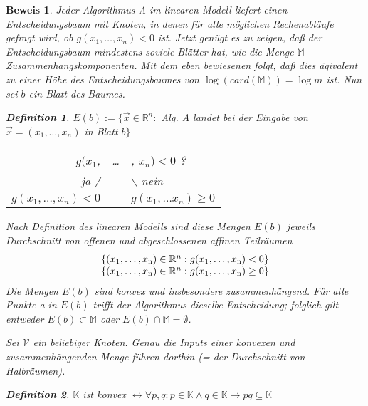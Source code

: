 \documentclass[ngerman,draft,parskip=half*,twoside]{scrreprt}
\theoremstyle{break}
\newtheorem{beweis}{Beweis}
\newtheorem{definition}{Definition}
\begin{document}
\begin{beweis}
Jeder Algorithmus A im linearen Modell liefert einen Entscheidungsbaum mit Knoten, in denen für alle möglichen Rechenabläufe
gefragt wird, ob \( g( x_1, \dots , x_n) < 0 \)  ist. Jetzt genügt es zu zeigen, daß der Entscheidungsbaum mindestens soviele
Blätter hat, wie die Menge \( \mathbb{M}  \) Zusammenhangskomponenten. Mit dem eben bewiesenen folgt, daß dies äqivalent zu einer Höhe
des Entscheidungsbaumes von \(\log (card(\mathbb{M}))=\log m\) ist. Nun sei $b$ ein Blatt des Baumes.

  \begin{definition}
  \(E(b) := \lbrace \vec x \in \mathbb{R}^n : \) Alg. A landet bei der Eingabe von \( \vec x = (x_1, \dots ,x_n) \) in Blatt \( b \rbrace \)
  \end{definition}
		
  \begin{tabular}{rcl}
  \( g(x_1\), & \dots & , \( x_n) < 0 \) ? \\
  ja / & & \( \backslash \) nein\\
  \( g(x_1, \dots, x_n) < 0 \) & & \( g(x_1, \dots x_n) \geq 0 \)
  \end{tabular}
\bigskip
  
Nach Definition des linearen Modells sind diese Mengen $E(b)$ jeweils Durchschnitt von offenen und abgeschlossenen affinen Teilräumen
\begin{gather*}
  \begin{array}{c}
  \{(x_1,\ldots,x_{\textup{n}}) \in \mathbb{R}^n : g(x_1,\ldots,x_{\textup{n}})<0\}\\
  \{(x_1,\ldots,x_{\textup{n}}) \in \mathbb{R}^n : g(x_1,\ldots,x_{\textup{n}})\geq0\}
  \end{array}
\end{gather*}
Die Mengen $E(b)$ sind konvex und insbesondere zusammenhängend. Für alle Punkte a in $E(b)$ trifft der Algorithmus dieselbe
Entscheidung; folglich gilt entweder \(E(b) \subset \mathbb{M}\) oder \(E(b) \cap \mathbb{M}=\emptyset\). 

Sei $\mathcal{V}$ ein beliebiger Knoten.
Genau die Inputs einer konvexen und zusammenhängenden Menge führen dorthin (= der Durchschnitt von Halbräumen).	
  
  \begin{definition}	
  \( \mathbb{K} \) ist \textit{konvex}
  \(\leftrightarrow  \forall   p,   q: p\in \mathbb{K} \wedge q \in \mathbb{K}
  \rightarrow  \overline{pq} \subseteq \mathbb{K}\)
  \end{definition}
  

\end{beweis}
\end{document}

